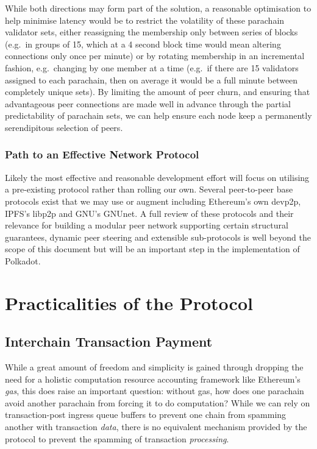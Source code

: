 \documentclass{beamer}
\makeatletter
\newcommand*\eg{e.g.\@\xspace}
\makeatother
\begin{document}
\begin{frame}
While both directions may form part of the solution, a reasonable optimisation to help minimise latency would be to restrict the volatility of these parachain validator sets, either reassigning the membership only between series of blocks (\eg~in groups of 15, which at a 4 second block time would mean altering connections only once per minute) or by rotating membership in an incremental fashion, \eg~changing by one member at a time (\eg~if there are 15 validators assigned to each parachain, then on average it would be a full minute between completely unique sets). By limiting the amount of peer churn, and ensuring that advantageous peer connections are made well in advance through the partial predictability of parachain sets, we can help ensure each node keep a permanently serendipitous selection of peers.

\subsubsection{Path to an Effective Network Protocol}
\label{path-to-an-effective-network-protocol}

Likely the most effective and reasonable development effort will focus on utilising a pre-existing protocol rather than rolling our own. Several peer-to-peer base protocols exist that we may use or augment including Ethereum's own devp2p\cite{devp2p}, IPFS's libp2p\cite{libp2p} and GNU's GNUnet\cite{bennett2002gnunet}. A full review of these protocols and their relevance for building a modular peer network supporting certain structural guarantees, dynamic peer steering and extensible sub-protocols is well beyond the scope of this document but will be an important step in the implementation of Polkadot.

\section{Practicalities of the Protocol}
\label{practicalities-of-the-protocol}

\subsection{Interchain Transaction Payment}

While a great amount of freedom and simplicity is gained through dropping the need for a holistic computation resource accounting framework like Ethereum's \textit{gas}, this does raise an important question: without gas, how does one parachain avoid another parachain from forcing it to do computation? While we can rely on transaction-post ingress queue buffers to prevent one chain from spamming another with transaction \textit{data}, there is no equivalent mechanism provided by the protocol to prevent the spamming of transaction \textit{processing}.


\end{frame}
\end{document}
